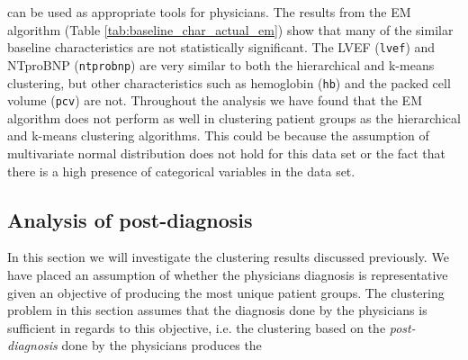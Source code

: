\documentclass[../thesis.tex]{subfiles}
\begin{document}


\noindent can be used as appropriate tools for physicians. The results from the EM algorithm (Table \ref{tab:baseline_char_actual_em}) show that many of the similar baseline characteristics are not statistically significant. The LVEF (\texttt{lvef}) and NTproBNP (\texttt{ntprobnp}) are very similar to both the hierarchical and k-means clustering, but other characteristics such as hemoglobin (\texttt{hb}) and the packed cell volume (\texttt{pcv}) are not. Throughout the analysis we have found that the EM algorithm does not perform as well in clustering patient groups as the hierarchical and k-means clustering algorithms. This could be because the assumption of multivariate normal distribution does not hold for this data set or the fact that there is a high presence of categorical variables in the data set.

\subsection{Analysis of post-diagnosis}

\noindent In this section we will investigate the clustering results discussed previously. We have placed an assumption of whether the physicians diagnosis is representative given an objective of producing the most unique patient groups. The clustering problem in this section assumes that the diagnosis done by the physicians is sufficient in regards to this objective, i.e. the clustering based on the \textit{post-diagnosis} done by the physicians produces the  


\end{document}
